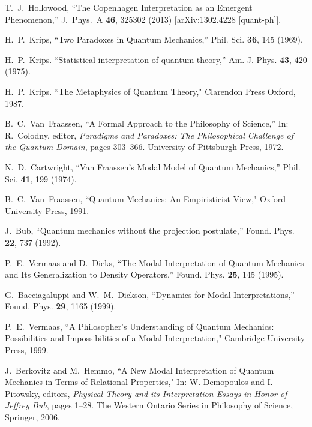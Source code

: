 \documentclass[%
preprint,
nofootinbib,
 amsmath,amssymb,
aps,
]{revtex4-1}
\begin{document}
\begin{thebibliography}{10}

  T.~J.~Hollowood,
  ``The Copenhagen Interpretation as an Emergent Phenomenon,''
  J.\ Phys.\ A {\bf 46}, 325302 (2013)
  [arXiv:1302.4228 [quant-ph]].


H.~P.~Krips, ``Two Paradoxes in Quantum Mechanics,''
   Phil. Sci. {\bf36}, 145 (1969).

H.~P.~Krips.
   ``Statistical interpretation of quantum theory,''
   Am. J. Phys. {\bf43}, 420 (1975).

H.~P.~Krips.
   ``The Metaphysics of Quantum Theory,"
   Clarendon Press Oxford, 1987.

B.~C.~Van~Fraassen,
   ``A Formal Approach to the Philosophy of Science,''
   In: R.~Colodny, editor, {\em {Paradigms and Paradoxes: The
  Philosophical Challenge of the Quantum Domain}}, pages 303--366. University
  of Pittsburgh Press, 1972.

N.~D.~Cartwright,
   ``Van Fraassen's Modal Model of Quantum Mechanics,''
   Phil. Sci. {\bf41}, 199 (1974).

B.~C.~Van~Fraassen,
   ``Quantum Mechanics: An Empiristicist View,"
   Oxford University Press, 1991.

J.~Bub, ``Quantum mechanics without the projection postulate,''
   Found. Phys. {\bf22}, 737 (1992).

P.~E.~Vermaas and D.~Dieks,
   ``The Modal Interpretation of Quantum Mechanics and Its
  Generalization to Density Operators,''
   Found. Phys. {\bf25}, 145 (1995).


G.~Bacciagaluppi and W.~M.~Dickson, ``Dynamics for Modal Interpretations,''
   Found. Phys. {\bf29}, 1165 (1999).

P.~E.~Vermaas,
   ``A Philosopher's Understanding of Quantum Mechanics:
  Possibilities and Impossibilities of a Modal Interpretation,"
   Cambridge University Press, 1999.

 J.~Berkovitz and M.~Hemmo, ``A New Modal Interpretation of Quantum Mechanics in Terms of Relational Properties," In: W. Demopoulos and I. Pitowsky, editors, {\em Physical Theory and its Interpretation Essays in Honor of Jeffrey Bub\/},  pages 1--28. The Western Ontario Series in Philosophy of Science, Springer, 2006.


\end{thebibliography}
\end{document}
